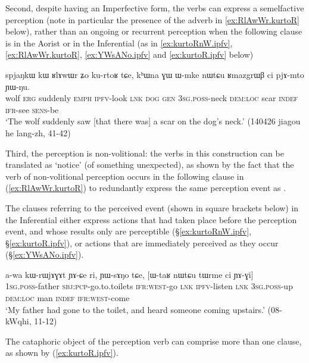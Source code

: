 Second, despite having an Imperfective form, the verbs can express a semelfactive perception (note in particular the presence of the adverb  in \ref{ex:RlAwWr.kurtoR} below), rather than an ongoing or recurrent perception when the following clause is in the Aorist or in the Inferential (as in \ref{ex:kurtoRnW.ipfv}, \ref{ex:RlAwWr.kurtoR}, \ref{ex:YWsANo.ipfv} and \ref{ex:kurtoR.ipfv} below)  

\begin{exe}
\ex \label{ex:RlAwWr.kurtoR}
\gll spjaŋkɯ kɯ ʁlɤwɯr ʑo ku-rtoʁ tɕe, kʰɯna ɣɯ ɯ-mke nɯtɕu ʁmazgrɯβ ci pjɤ-mto ɲɯ-ŋu.  \\
wolf \textsc{erg} suddenly \textsc{emph} \textsc{ipfv}-look \textsc{lnk} \textsc{dog} \textsc{gen} \textsc{3sg}.\textsc{poss}-neck \textsc{dem}:\textsc{loc} scar \textsc{indef} \textsc{ifr}-see \textsc{sens}-be \\
\glt `The wolf suddenly saw [that there was] a scar on the dog's neck.' (140426 jiagou he lang-zh, 41-42)
\end{exe}

Third, the perception is non-volitional: the verbs in this construction can be translated as `notice' (of something unexpected), as shown by the fact that the verb of non-volitional perception  occurs in the following clause in (\ref{ex:RlAwWr.kurtoR}) to redundantly express the same perception event as . 

The clauses referring to the perceived event (shown in square brackets below) in the Inferential either express actions that had taken place before the perception event, and whose results only are perceptible (§\ref{ex:kurtoRnW.ipfv}, §\ref{ex:kurtoR.ipfv}), or actions that are immediately perceived as they occur (§\ref{ex:YWsANo.ipfv}).


\begin{exe}
\ex \label{ex:YWsANo.ipfv}
\gll a-wa kɯ-rɯjɤɣɤt ɲɤ-ɕe ri, ɲɯ-sɤŋo tɕe, [ɯ-taʁ nɯtɕu tɯrme ci ɲɤ-ɣi]  \\
\textsc{1sg}.\textsc{poss}-father \textsc{sbj}:\textsc{pcp}-go.to.toilets \textsc{ifr}:\textsc{west}-go \textsc{lnk} \textsc{ipfv}-listen \textsc{lnk} \textsc{3sg}.\textsc{poss}-up \textsc{dem}:\textsc{loc} man \textsc{indef} \textsc{ifr}:\textsc{west}-come \\
\glt `My father had gone to the toilet, and heard  someone coming upstairs.' (08-kWqhi, 11-12)
\end{exe}

The cataphoric object of the perception verb can comprise more than one clause, as shown by (\ref{ex:kurtoR.ipfv}).


